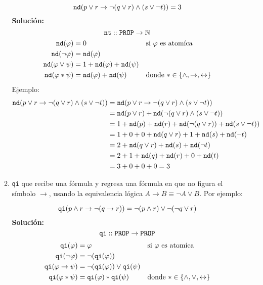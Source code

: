 \documentclass[8pt, letterpaper]{article}
\begin{document}
\begin{enumerate}
\begin{enumerate}
    $${\tt nd} (p \lor r \to \lnot (q \lor r) \land (s\lor\neg t)) = 3$$
    \ttfamily
    {\bf Solución:}
    \hfill\break
    $${\tt nt} :: {\tt PROP} \rightarrow \mathbb{N}$$
    \begin{align*}
      {\tt nd}(\varphi) &= 0 & &\text{si $\varphi$ es atomíca}\\
      {\tt nd}(\neg\varphi) &= {\tt nd}(\varphi) \\
      {\tt nd}(\varphi \lor \psi) &= 1 + {\tt nd}(\varphi) +
      {\tt nd}(\psi) \\
      {\tt nd}(\varphi * \psi) &= {\tt nd}(\varphi) + {\tt nd}(\psi) &
      &\text{donde $*$} \in\{\land, \rightarrow, \leftrightarrow\}\\
    \end{align*}
    \newpage
    Ejemplo:
    \begin{align*}
      {\tt nd} (p \lor r \to \lnot (q \lor r) \land (s\lor\neg t)) &= {\tt nd} (p \lor r \to \lnot (q \lor r) \land (s\lor\neg t)) \\
      &= {\tt nd}(p \lor r) + {\tt nd}(\lnot (q \lor r) \land (s\lor\neg t)) \\
      &= 1 + {\tt nd}(p) + {\tt nd}( r) + {\tt nd}(\lnot (q \lor r)) +
      {\tt nd}(s\lor\neg t)) \\
      &= 1 + 0 + 0 + {\tt nd}(q \lor r) + 1 +{\tt nd}(s) + {\tt nd}(\neg t) \\
      &= 2 + {\tt nd}(q \lor r) + {\tt nd}(s) + {\tt nd}(\neg t) \\
      &= 2 + 1 + {\tt nd}(q) + {\tt nd}(r) + 0 + {\tt nd}(t) \\
      &= 3 + 0 +0 +0 = 3
    \end{align*}
    
    \rmfamily
    
  \item {\tt qi} que recibe una fórmula y regresa una fórmula en que no figura
    el símbolo $\to$, usando la equivalencia lógica
    $A\to B\equiv \neg A\lor B$. Por ejemplo:
    
    $${\tt qi} (p \land r \to \lnot (q \to r)) = \lnot (p \land r) \lor \lnot(\lnot q \lor r)$$
        \ttfamily
    {\bf Solución:}
    \hfill\break
    $${\tt qi} :: {\tt PROP} \rightarrow {\tt PROP}$$
    \begin{align*}
      {\tt qi}(\varphi) &= \varphi & &\text{si $\varphi$ es atomíca}\\
      {\tt qi}(\neg\varphi) &= \neg({\tt qi}(\varphi))\\
      {\tt qi}(\varphi \rightarrow \psi) &= \neg({\tt qi}(\varphi))\lor {\tt qi}(\psi) \\
      {\tt qi}(\varphi * \psi) &= {\tt qi}(\varphi) * {\tt qi}(\psi) &
      &\text{donde $*$} \in\{\land, \lor, \leftrightarrow\}
    \end{align*}
    

\end{enumerate}
\end{enumerate}
\end{document}
